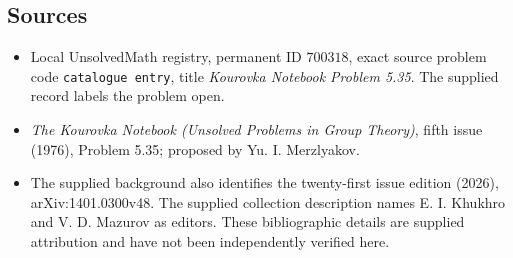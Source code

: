 \documentclass[11pt]{article}
\begin{document}
\subsection{Sources}
\begin{itemize}
\item Local UnsolvedMath registry, permanent ID \(700318\), exact source problem code \texttt{catalogue entry}, title \emph{Kourovka Notebook Problem 5.35}. The supplied record labels the problem open.
\item \emph{The Kourovka Notebook (Unsolved Problems in Group Theory)}, fifth issue (1976), Problem 5.35; proposed by Yu. I. Merzlyakov.
\item The supplied background also identifies the twenty-first issue edition (2026), arXiv:1401.0300v48. The supplied collection description names E. I. Khukhro and V. D. Mazurov as editors. These bibliographic details are supplied attribution and have not been independently verified here.
\end{itemize}
\end{document}
